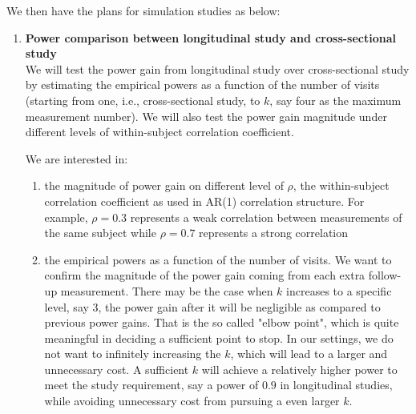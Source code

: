 \documentclass[12pt]{article}
\begin{document}
We then have the plans for simulation studies as below:
\begin{enumerate}
\item \textbf{Power comparison between longitudinal study and cross-sectional study}\\
We will test the power gain from longitudinal study over cross-sectional study by estimating the empirical powers as a function of the number of visits (starting from one, i.e., cross-sectional study, to $k$, say four as the maximum measurement number). We will also test the power gain magnitude under different levels of within-subject correlation coefficient.

We are interested in:
\begin{enumerate}
\item the magnitude of power gain on different level of $\rho$, the within-subject correlation coefficient as used in AR(1) correlation structure. For example, $\rho = 0.3$ represents a weak correlation between measurements of the same subject while $\rho = 0.7$ represents a strong correlation 
\item the empirical powers as a function of the number of visits. We want to confirm the magnitude of the power gain coming from each extra follow-up measurement. There may be the case when $k$ increases to a specific level, say 3, the power gain after it will be negligible as compared to previous power gains. That is the so called "elbow point", which is quite meaningful in deciding a sufficient point to stop. In our settings, we do not want to infinitely increasing the $k$, which will lead to a larger and unnecessary cost. A sufficient $k$ will achieve a relatively higher power to meet the study requirement, say a power of $0.9$ in longitudinal studies, while avoiding unnecessary cost from pursuing a even larger $k$.
\end{enumerate}




\end{enumerate}
\end{document}
